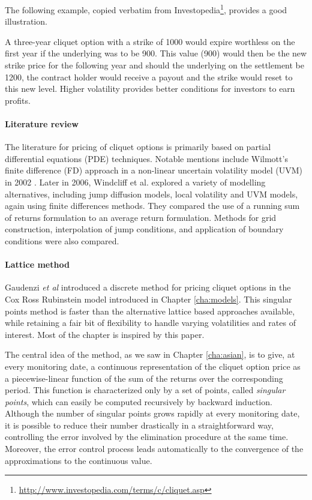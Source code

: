 The following example, copied verbatim from Investopedia\footnote{\url{http://www.investopedia.com/terms/c/cliquet.asp}}, provides a good illustration.
\begin{eg}
	A three-year cliquet option with a strike of 1000 would expire worthless on the first year if the underlying was to be 900. This value (900) would then be the new strike price for the following year and should the underlying on the settlement be 1200, the contract holder would receive a payout and the strike would reset to this new level. Higher volatility provides better conditions for investors to earn profits.
\end{eg}



\paragraph{Literature review}
The literature for pricing of cliquet options is primarily based on partial differential equations (PDE) techniques. Notable mentions include Wilmott's finite difference (FD) approach in a non-linear uncertain volatility model (UVM) in 2002 \cite{Wilmott2002}. Later in 2006, Windcliff et al.\cite{Windcliff2006} explored a variety of modelling alternatives, including jump diffusion models, local volatility and UVM models, again using finite differences methods. They compared the use of a running sum of returns formulation to an average return formulation. Methods for grid construction, interpolation of jump conditions, and application of boundary conditions were also compared.


\paragraph{Lattice method}
Gaudenzi \emph{et al}\cite{Gaudenzi2011} introduced a discrete method for pricing cliquet options in the Cox Ross Rubinstein model \cite{Cox1979} introduced in Chapter \ref{cha:models}. This singular points method is faster than the alternative lattice based approaches available, while retaining a fair bit of flexibility to handle varying volatilities and rates of interest. Most of the chapter is inspired by this paper.

The central idea of the method, as we saw in Chapter \ref{cha:asian}, is to give, at every monitoring date, a continuous representation of the cliquet option price as a piecewise-linear function of the sum of the returns over the corresponding period. This function is characterized only by a set of points, called \emph{singular points}, which can easily be computed recursively by backward induction. Although the number of singular points grows rapidly at every monitoring date, it is possible to reduce their number drastically in a
straightforward way, controlling the error involved by the elimination procedure at the same time. Moreover, the error control process leads automatically to the convergence of the approximations to the continuous value.



